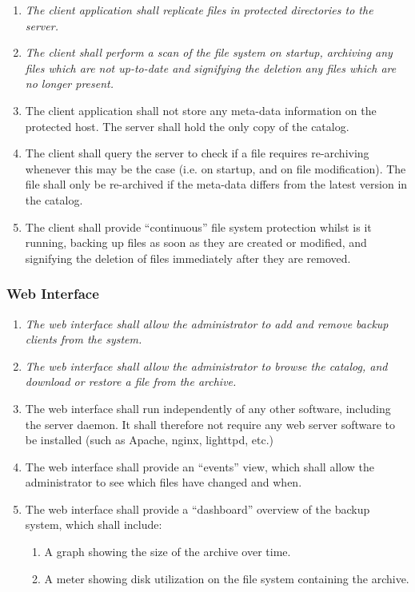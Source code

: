 \begin{enumerate}
    \item \emph{The client application shall replicate files in
        protected directories to the server.}
    \item \emph{The client shall perform a scan of the file system on
        startup, archiving any files which are not up-to-date and
        signifying the deletion any files which are no longer present.}
    \item The client application shall not store any meta-data
        information on the protected host. The server shall hold the
        only copy of the catalog.
    \item The client shall query the server to check if a file
        requires re-archiving whenever this may be the case (i.e. on
        startup, and on file modification). The file shall only be
        re-archived if the meta-data differs from the latest version in
        the catalog.
    \item The client shall provide ``continuous'' file system
        protection whilst is it running, backing up files as soon as
        they are created or modified, and signifying the deletion of
        files immediately after they are removed.
\end{enumerate}

\subsubsection{Web Interface}

\begin{enumerate}
    \item \emph{The web interface shall allow the administrator to add
        and remove backup clients from the system.}
    \item \emph{The web interface shall allow the administrator to
        browse the catalog, and download or restore a file from the
        archive.}
    \item The web interface shall run independently of any other
        software, including the server daemon. It shall therefore not
        require any web server software to be installed (such as
        Apache, nginx, lighttpd, etc.)
    \item The web interface shall provide an ``events'' view, which
        shall allow the administrator to see which files have changed
        and when.
    \item The web interface shall provide a ``dashboard'' overview of
        the backup system, which shall include:
        \begin{enumerate}
            \item A graph showing the size of the archive over time.
            \item A meter showing disk utilization on the file system
                containing the archive.
        \end{enumerate}
\end{enumerate}

